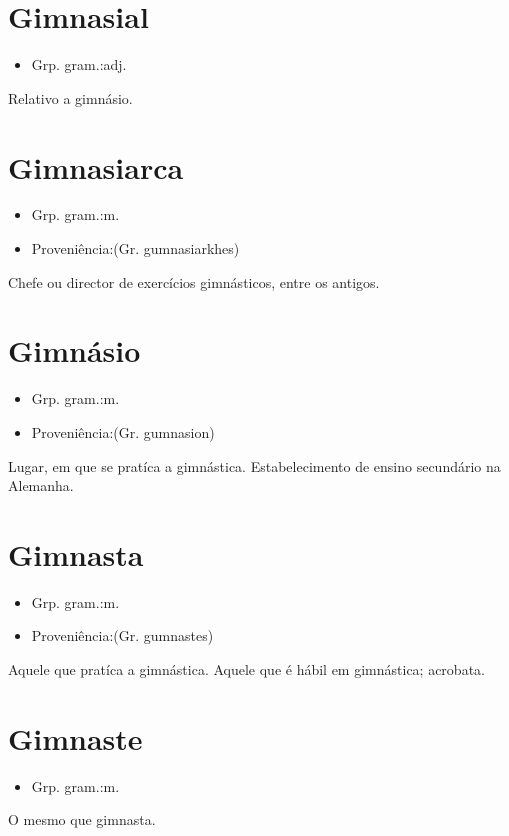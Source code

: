\section{Gimnasial}
\begin{itemize}
\item {Grp. gram.:adj.}
\end{itemize}
Relativo a gimnásio.
\section{Gimnasiarca}
\begin{itemize}
\item {Grp. gram.:m.}
\end{itemize}
\begin{itemize}
\item {Proveniência:(Gr. \textunderscore gumnasiarkhes\textunderscore )}
\end{itemize}
Chefe ou director de exercícios gimnásticos, entre os antigos.
\section{Gimnásio}
\begin{itemize}
\item {Grp. gram.:m.}
\end{itemize}
\begin{itemize}
\item {Proveniência:(Gr. \textunderscore gumnasion\textunderscore )}
\end{itemize}
Lugar, em que se pratíca a gimnástica.
Estabelecimento de ensino secundário na Alemanha.
\section{Gimnasta}
\begin{itemize}
\item {Grp. gram.:m.}
\end{itemize}
\begin{itemize}
\item {Proveniência:(Gr. \textunderscore gumnastes\textunderscore )}
\end{itemize}
Aquele que pratíca a gimnástica.
Aquele que é hábil em gimnástica; acrobata.
\section{Gimnaste}
\begin{itemize}
\item {Grp. gram.:m.}
\end{itemize}
O mesmo que \textunderscore gimnasta\textunderscore .
